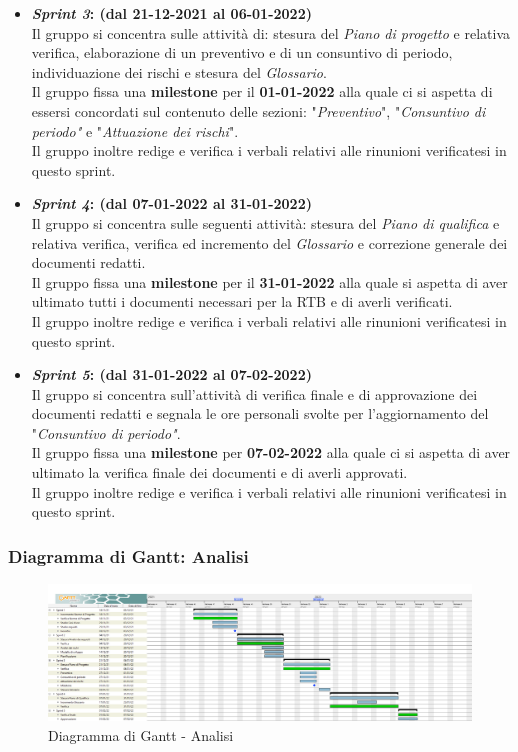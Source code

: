 \begin{itemize}
    \item \textbf{\textit{Sprint 3}: (dal 21-12-2021 al 06-01-2022)}\\
    Il gruppo si concentra sulle attività di: stesura del \textit{Piano di progetto} e relativa verifica, elaborazione di un preventivo e di un consuntivo di periodo, individuazione dei rischi e stesura del \textit{Glossario}.\\
    Il gruppo fissa una \textbf{milestone} per il \textbf{01-01-2022} alla quale ci si aspetta di essersi concordati sul contenuto delle sezioni: "\textit{Preventivo}", "\textit{Consuntivo di periodo"} e "\textit{Attuazione dei rischi}".\\
    Il gruppo inoltre redige e verifica i verbali relativi alle rinunioni verificatesi in questo sprint.

    \item \textbf{\textit{Sprint 4}: (dal 07-01-2022 al 31-01-2022)}\\
    Il gruppo si concentra sulle seguenti attività: stesura del \textit{Piano di qualifica} e relativa verifica, verifica ed incremento del \textit{Glossario} e correzione generale dei documenti redatti.\\
    Il gruppo fissa una \textbf{milestone} per il \textbf{31-01-2022} alla quale si aspetta di aver ultimato tutti i documenti necessari per la RTB e di averli verificati.\\
    Il gruppo inoltre redige e verifica i verbali relativi alle rinunioni verificatesi in questo sprint.

    \item \textbf{\textit{Sprint 5}: (dal 31-01-2022 al 07-02-2022)}\\
    Il gruppo si concentra sull'attività di verifica finale e di approvazione dei documenti redatti  e segnala le ore personali svolte per l'aggiornamento del "\textit{Consuntivo di periodo"}. \\
    Il gruppo fissa una \textbf{milestone} per \textbf{07-02-2022} alla quale ci si aspetta di aver ultimato la verifica finale dei documenti e di averli approvati.\\
    Il gruppo inoltre redige e verifica i verbali relativi alle rinunioni verificatesi in questo sprint.
\end{itemize}
\newpage
\subsubsection{Diagramma di Gantt: Analisi}
\begin{figure}[h!]
    \centering
    \includegraphics[scale=0.22]{../../assets/Diagrammi_Gantt/Analisi.png}
    \caption{Diagramma di Gantt - Analisi}
\end{figure}

